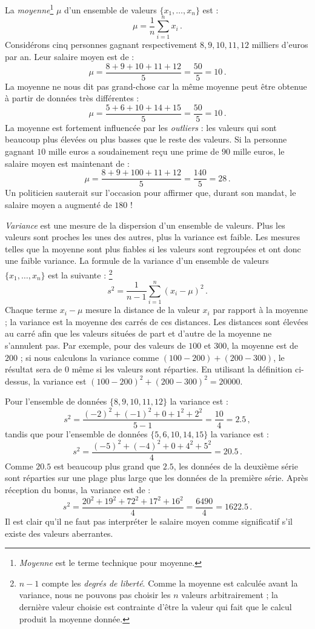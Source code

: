 La \emph{moyenne}\footnote{\textit{Moyenne} est le terme technique pour moyenne.} $\mu$ d'un ensemble de valeurs $\{x_1,\ldots,x_n\}$ est :
\[
\mu = \frac{1}{n}\sum^n_{i=1} x_i\,.
\]
Considérons cinq personnes gagnant respectivement $8,9,10,11,12$ milliers d'euros par an. Leur salaire moyen est de :
\[
\mu = \frac{8+9+10+11+12}{5} = \frac{50}{5} = 10\,.
\]
La moyenne ne nous dit pas grand-chose car la même moyenne peut être obtenue à partir de données très différentes :
\[
\mu = \frac{5+6+10+14+15}{5} = \frac{50}{5} = 10\,.
\]
La moyenne est fortement influencée par les \emph{outliers} : les valeurs qui sont beaucoup plus élevées ou plus basses que le reste des valeurs. Si la personne gagnant $10$ mille euros a soudainement reçu une prime de $90$ mille euros, le salaire moyen est maintenant de :
\[
\mu = \frac{8+9+100+11+12}{5} = \frac{140}{5} = 28\,.
\]
Un politicien sauterait sur l'occasion pour affirmer que, durant son mandat, le salaire moyen a augmenté de $180$ !

\emph{Variance} est une mesure de la dispersion d'un ensemble de valeurs. Plus les valeurs sont proches les unes des autres, plus la variance est faible. Les mesures telles que la moyenne sont plus fiables si les valeurs sont regroupées et ont donc une faible variance. La formule de la variance d'un ensemble de valeurs $\{x_1,\ldots,x_n\}$ est la suivante : \footnote{$n-1$ compte les \emph{degrés de liberté}. Comme la moyenne est calculée avant la variance, nous ne pouvons pas choisir les $n$ valeurs arbitrairement ; la dernière valeur choisie est contrainte d'être la valeur qui fait que le calcul produit la moyenne donnée.}
\[
s^2 = \frac{1}{n-1}\sum^n_{i=1} (x_i-\mu)^2\,.
\]
Chaque terme $x_i-\mu$ mesure la distance de la valeur $x_i$ par rapport à la moyenne ; la variance est la moyenne des carrés de ces distances. Les distances sont élevées au carré afin que les valeurs situées de part et d'autre de la moyenne ne s'annulent pas. Par exemple, pour des valeurs de $100$ et $300$, la moyenne est de $200$ ; si nous calculons la variance comme $(100-200)+(200-300)$, le résultat sera de $0$ même si les valeurs sont réparties. En utilisant la définition ci-dessus, la variance est $(100-200)^2+(200-300)^2=20000$.

Pour l'ensemble de données $\{8,9,10,11,12\}$ la variance est :
\[
s^2 = \frac{(-2)^2+(-1)^2+0+1^2+2^2}{5-1} = \frac{10}{4} = 2.5\,,
\]
tandis que pour l'ensemble de données $\{5,6,10,14,15\}$ la variance est :
\[
s^2 = \frac{(-5)^2+(-4)^2+0+4^2+5^2}{4} = 20.5\,.
\]
Comme $20.5$ est beaucoup plus grand que $2.5$, les données de la deuxième série sont réparties sur une plage plus large que les données de la première série. Après réception du bonus, la variance est de :
\[
s^2 = \frac{20^2+19^2+72^2+17^2+16^2}{4} = \frac{6490}{4} = 1622.5\,.
\]
Il est clair qu'il ne faut pas interpréter le salaire moyen comme significatif s'il existe des valeurs aberrantes.

